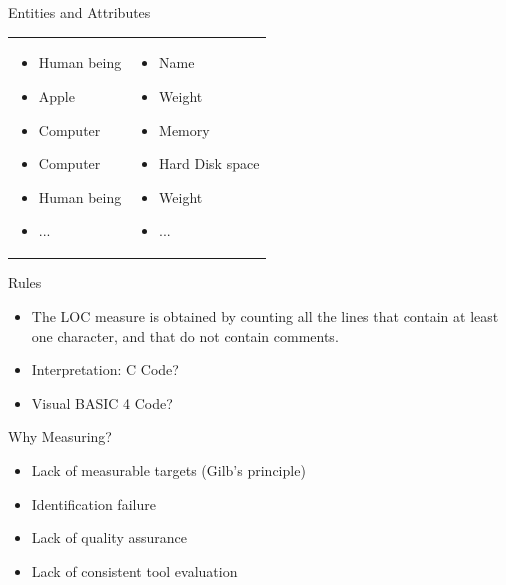 \documentclass{beamer}
\begin{document}
\begin{frame}{\centerline{Entities and Attributes}}


\begin{table}[H]
\begin{tabulary}{\textwidth}{m{5.5cm} m{5.5cm}}
\begin{itemize}    
    \item Human being
    \item Apple
    \item Computer
    \item Computer
    \item Human being
    \item ...
\end{itemize} &
\begin{itemize}    
    \item Name
    \item Weight
    \item Memory
    \item Hard Disk space
    \item Weight
    \item ...
\end{itemize}
\end{tabulary}
\end{table}
\end{frame}

\begin{frame}{\centerline{Rules}}

\begin{itemize}    
    \item The LOC measure is obtained by counting all the lines that contain at least one character, and that do not contain comments.
    \item Interpretation: C Code?
    \item Visual BASIC 4 Code?
\end{itemize}
\end{frame}

\begin{frame}{\centerline{Why Measuring?}}


\begin{itemize}
\item Lack of measurable targets (Gilb's principle)
\item Identification failure
\item Lack of quality assurance
\item Lack of consistent tool evaluation
\end{itemize}

\end{frame}
\end{document}
